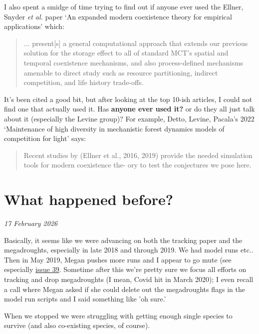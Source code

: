 \documentclass[11pt]{article}
\begin{document}
I also spent a smidge of time trying to find out if anyone ever used the Ellner, Snyder \emph{et al.} paper `An expanded modern coexistence theory for empirical applications' which:
\begin{quote}
... present[s] a general computational approach that extends our previous solution for the storage effect to all of standard MCT's spatial and temporal coexistence mechanisms, and also process-defined mechanisms amenable to direct study such as resource partitioning, indirect competition, and life history trade-offs.
\end{quote}
It's been cited a good bit, but after looking at the top 10-ish articles, I could not find one that actually used it. Has {\bf anyone ever used it?} or do they all just talk about it (especially the Levine group)? For example, Detto, Levine, Pacala's 2022 `Maintenance of high diversity in mechanistic forest dynamics models of competition for light' says: 
\begin{quote}
Recent studies by (Ellner et al., 2016, 2019) provide the needed simulation tools for modern coexistence the- ory to test the conjectures we pose here.
\end{quote}

\section{What happened before?}

\emph{17 February 2026}

Basically, it seems like we were advancing on both the tracking paper and the megadroughts, especially in late 2018 and through 2019. We had model runs etc.. Then in May 2019, Megan pushes more runs and I appear to go mute (see especially \href{https://github.com/lizzieinvancouver/temporalvar/issues/39}{issue 39}. Sometime after this we're pretty sure we focus all efforts on tracking and drop megadroughts (I mean, Covid hit in March 2020); I even recall a call where Megan asked if she could delete out the megadroughts flags in the model run scripts and I said something like 'oh sure.'

When we stopped we were struggling with getting enough single species to survive (and also co-existing species, of course). 
\end{document}
